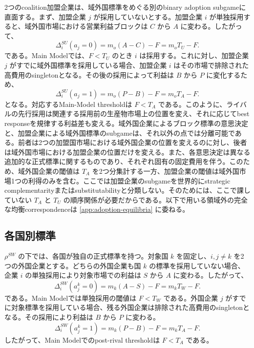 2つのcoalition加盟企業は、域外国標準をめぐる別のbinary adoption subgameに直面する。まず、加盟企業 $j$ が採用していないとする。加盟企業 $i$ が単独採用すると、域外国市場における営業利益ブロックは $C$ から $A$ に変わる。したがって、
\begin{equation}
    \Delta_i^{SU}(a_j=0)
    =m_o(A-C)-F
    =m_oT_U-F.
    \label{eq:su-member-unilateral-gain}
\end{equation}
である。Main Modelでは、$F<T_U$ のとき $i$ は採用する。これに対し、加盟企業 $j$ がすでに域外国標準を採用している場合、加盟企業 $i$ はその市場で排除された高費用のsingletonとなる。その後の採用によって利益は $B$ から $P$ に変化するため、
\begin{equation}
    \Delta_i^{SU}(a_j=1)
    =m_o(P-B)-F
    =m_oT_A-F.
    \label{eq:su-member-post-rival-gain}
\end{equation}
となる。対応するMain-Model thresholdは $F<T_A$ である。このように、ライバルの先行採用は関連する採用前の生産物市場上の位置を変え、それに応じてbest responseを規律する利益差も変える。域外国企業によるブロック標準の意思決定と、加盟企業による域外国標準のsubgameは、それ以外の点では分離可能である。前者は2つの加盟国市場における域外国企業の位置を変えるのに対し、後者は域外国市場における加盟企業の位置だけを変える。また、各意思決定は異なる追加的な正式標準に関するものであり、それぞれ固有の固定費用を伴う。このため、域外国企業の閾値は $T_A$ を2つ分集計する一方、加盟企業の閾値は域外国市場1つの利得のみを含む。ここでは加盟企業のsubgameを世界的にstrategic complementarityまたはsubstitutabilityと分類しない。そのためには、ここで課していない $T_A$ と $T_U$ の順序関係が必要だからである。以下で用いる領域外の完全な均衡correspondenceは \ref{app:adoption-equilibria} に委ねる。

\subsection{各国別標準}
\label{subsec:private-sw}

$\rho^{SW}$ の下では、各国が独自の正式標準を持つ。対象国 $k$ を固定し、$i,j\neq k$ を2つの外国企業とする。どちらの外国企業も国 $k$ の標準を採用していない場合、企業 $i$ の単独採用により対象市場での利益は $S$ から $A$ に変わる。したがって、
\begin{equation}
    \Delta_i^{SW}(a_j^k=0)
    =m_k(A-S)-F
    =m_kT_W-F.
    \label{eq:sw-unilateral-gain}
\end{equation}
である。Main Modelでは単独採用の閾値は $F<T_W$ である。外国企業 $j$ がすでに対象標準を採用している場合、残る外国企業は排除された高費用のsingletonとなる。その採用により利益は $B$ から $P$ に変わる。
\begin{equation}
    \Delta_i^{SW}(a_j^k=1)
    =m_k(P-B)-F
    =m_kT_A-F.
    \label{eq:sw-post-rival-gain}
\end{equation}
したがって、Main Modelでのpost-rival thresholdは $F<T_A$ である。

